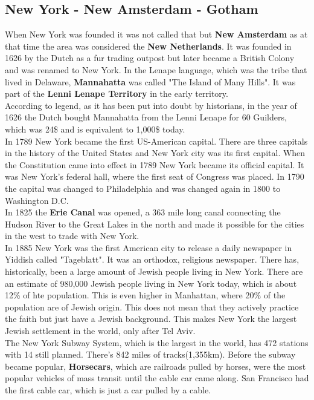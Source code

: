 \documentclass{article}
\begin{document}
	\subsection{New York - New Amsterdam - Gotham}
	When New York was founded it was not called that but \textbf{New Amsterdam} as at that time the area was considered the \textbf{New Netherlands}. It was founded in 1626 by the Dutch as a fur trading outpost but later became a British Colony and was renamed to New York.
	In the Lenape language, which was the tribe that lived in Delaware, \textbf{Mannahatta} was called "The Island of Many Hills". It was part of the \textbf{Lenni Lenape Territory} in the early territory. \\
	According to legend, as it has been put into doubt by historians, in the year of 1626 the Dutch bought Mannahatta from the Lenni Lenape for 60 Guilders, which was 24\$ and is equivalent to 1,000\$ today. \\
	In 1789 New York became the first US-American capital. There are three capitals in the history of the United States and New York city was its first capital. When the Constitution came into effect in 1789 New York became its official capital. It was New York's federal hall, where the first seat of Congress was placed. In 1790 the capital was changed to Philadelphia and was changed again in 1800 to Washington D.C. \\
	In 1825 the \textbf{Erie Canal} was opened, a 363 mile long canal connecting the Hudson River to the Great Lakes in the north and made it possible for the cities in the west to trade with New York. \\
	In 1885 New York was the first American city to release a daily newspaper in Yiddish called "Tageblatt". It was an orthodox, religious newspaper. There has, historically, been a large amount of Jewish people living in New York. There are an estimate of 980,000 Jewish people living in New York today, which is about 12\% of hte population. This is even higher in Manhattan, where 20\% of the population are of Jewish origin. This does not mean that they actively practice the faith but just have a Jewish background. This makes New York the largest Jewish settlement in the world, only after Tel Aviv. \\
	The New York Subway System, which is the largest in the world, has 472 stations with 14 still planned. There's 842 miles of tracks(1,355km).
	Before the subway became popular, \textbf{Horsecars}, which are railroads pulled by horses, were the most popular vehicles of mass transit until the cable car came along. San Francisco had the first cable car, which is just a car pulled by a cable. \\
\end{document}
